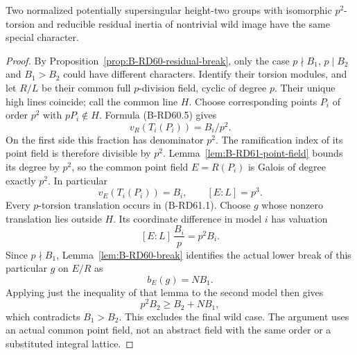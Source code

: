 \begin{proposition}
\label{prop:B-RD61-wild}
Two normalized potentially supersingular height-two groups with
isomorphic $p^2$-torsion and reducible residual inertia of nontrivial
wild image have the same special character.
\end{proposition}
\begin{proof}
By Proposition~\ref{prop:B-RD60-residual-break}, only the case
$p\nmid B_1$, $p\mid B_2$ and $B_1>B_2$ could have different
characters. Identify their torsion modules, and let $R/L$ be their
common full $p$-division field, cyclic of degree $p$.
Their unique high lines coincide; call the common line $H$.
Choose corresponding points $P_i$ of order $p^2$ with
$pP_i\notin H$. Formula (B-RD60.5) gives
\[
                 v_R(T_i(P_i))=B_i/p^2.
\]
On the first side this fraction has denominator $p^2$. The
ramification index of its point field is therefore divisible by
$p^2$. Lemma~\ref{lem:B-RD61-point-field} bounds its degree by
$p^2$, so the common point field $E=R(P_i)$ is Galois of degree
exactly $p^2$. In particular
\[
       v_E(T_i(P_i))=B_i,
       \qquad [E:L]=p^3.                              \tag{B-RD61.2}
\]
Every $p$-torsion translation occurs in (B-RD61.1).
Choose $g$ whose nonzero translation lies outside $H$.
Its coordinate difference in model $i$ has valuation
\[
       [E:L]\,\frac{B_i}{p}=p^2 B_i.                 \tag{B-RD61.3}
\]
Since $p\nmid B_1$, Lemma~\ref{lem:B-RD60-break} identifies the
actual lower break of this particular $g$ on $E/R$ as
\[
                          b_E(g)=NB_1.
\]
Applying just the inequality of that lemma to the second model
then gives
\[
                         p^2B_2\ge B_2+NB_1,
\]
which contradicts $B_1>B_2$. This excludes the final wild case.
The argument uses an actual common point field, not an abstract
field with the same order or a substituted integral lattice.
\end{proof}

